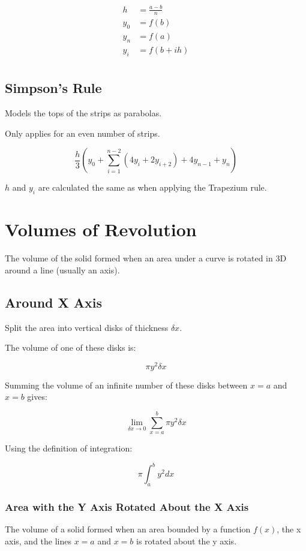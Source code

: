 \documentclass[a4paper,11pt]{article}
\begin{document}
$$
\begin{aligned}
h & = \frac{a - b}{n} \\
y_0 & = f(b) \\
y_n & = f(a) \\
y_i & = f(b + ih) \\
\end{aligned}
$$


\subsection{Simpson's Rule}

Models the tops of the strips as parabolas.

Only applies for an even number of strips.

$$
\frac{h}{3}(y_0 + \sum_{i = 1}^{n - 2} (4y_i + 2y_{i + 2}) + 4y_{n - 1} + y_n)
$$

$h$ and $y_i$ are calculated the same as when applying the Trapezium rule.




\section{Volumes of Revolution}

The volume of the solid formed when an area under a curve is rotated in 3D
around a line (usually an axis).


\subsection{Around X Axis}

Split the area into vertical disks of thickness $\delta x$.

The volume of one of these disks is:

$$
\pi y^2 \delta x
$$

Summing the volume of an infinite number of these disks between $x = a$ and
$x = b$ gives:

$$
\lim_{\delta x \to 0} \sum_{x = a}^{b} \pi y^2 \delta x
$$

Using the definition of integration:

$$
\pi \int^b_a y^2 dx
$$


\subsubsection{Area with the Y Axis Rotated About the X Axis}

The volume of a solid formed when an area bounded by a function $f(x)$, the x
axis, and the lines $x = a$ and $x = b$ is rotated about the y axis.
\end{document}
